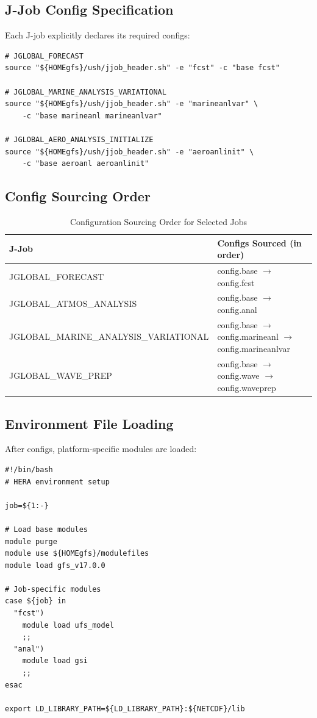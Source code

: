 \documentclass[11pt,letterpaper]{article}
\begin{document}
\subsection{J-Job Config Specification}

Each J-job explicitly declares its required configs:

\begin{lstlisting}[style=bashstyle, title=J-Job Examples]
# JGLOBAL_FORECAST
source "${HOMEgfs}/ush/jjob_header.sh" -e "fcst" -c "base fcst"

# JGLOBAL_MARINE_ANALYSIS_VARIATIONAL
source "${HOMEgfs}/ush/jjob_header.sh" -e "marineanlvar" \
    -c "base marineanl marineanlvar"

# JGLOBAL_AERO_ANALYSIS_INITIALIZE
source "${HOMEgfs}/ush/jjob_header.sh" -e "aeroanlinit" \
    -c "base aeroanl aeroanlinit"
\end{lstlisting}

\subsection{Config Sourcing Order}

\begin{table}[H]
\centering
\caption{Configuration Sourcing Order for Selected Jobs}
\label{tab:source-order}
\begin{tabular}{@{}lp{8cm}@{}}
\toprule
\textbf{J-Job} & \textbf{Configs Sourced (in order)} \\
\midrule
JGLOBAL\_FORECAST & config.base $\rightarrow$ config.fcst \\
JGLOBAL\_ATMOS\_ANALYSIS & config.base $\rightarrow$ config.anal \\
JGLOBAL\_MARINE\_ANALYSIS\_VARIATIONAL & config.base $\rightarrow$ config.marineanl $\rightarrow$ config.marineanlvar \\
JGLOBAL\_WAVE\_PREP & config.base $\rightarrow$ config.wave $\rightarrow$ config.waveprep \\
\bottomrule
\end{tabular}
\end{table}

\subsection{Environment File Loading}

After configs, platform-specific modules are loaded:

\begin{lstlisting}[style=bashstyle, title=env/HERA.env (Excerpt)]
#!/bin/bash
# HERA environment setup

job=${1:-}

# Load base modules
module purge
module use ${HOMEgfs}/modulefiles
module load gfs_v17.0.0

# Job-specific modules
case ${job} in
  "fcst")
    module load ufs_model
    ;;
  "anal")
    module load gsi
    ;;
esac

export LD_LIBRARY_PATH=${LD_LIBRARY_PATH}:${NETCDF}/lib
\end{lstlisting}
\end{document}
